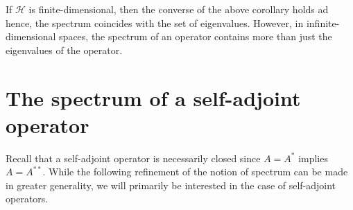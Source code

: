 \begin{remark}
If $\mathcal{H}$ is finite-dimensional, then the converse of the above corollary holds ad hence, the spectrum coincides with the set of eigenvalues. However, in infinite-dimensional spaces, the spectrum of an operator contains more than just the eigenvalues of the operator.
\end{remark}

\section{The spectrum of a self-adjoint operator}

Recall that a self-adjoint operator is necessarily closed since $A=A^*$ implies $A=A^{**}$. While the following refinement of the notion of spectrum can be made in greater generality, we will primarily be interested in the case of self-adjoint operators.

